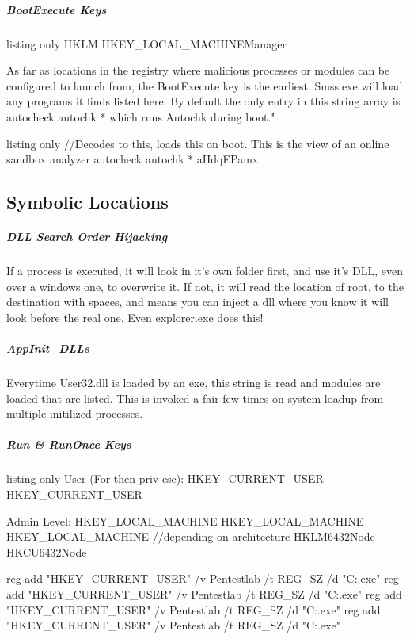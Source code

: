 \subparagraph{BootExecute Keys}
\begin{tcblisting}{listing only}
HKLM\SYSTEM\CurrentControlSet\Control\hivelist
HKEY_LOCAL_MACHINE\SYSTEM{}\Control\Session Manager
\end{tcblisting}

As far as locations in the registry where malicious processes or modules can be configured to launch from, the BootExecute key is the earliest. Smss.exe will load any programs it finds listed here. By default the only entry in this string array is autocheck autochk * which runs Autochk during boot."

\begin{tcblisting}{listing only}
//Decodes to this, loads this on boot. This is the view of an online sandbox analyzer
autocheck autochk * aHdqEPamx
\end{tcblisting}


\subsection{Symbolic Locations}

\subparagraph{DLL Search Order Hijacking}
If a process is executed, it will look in it's own folder first, and use it's DLL, even over a windows one, to overwrite it. If not, it will read the location of root, 
to the destination with spaces, and means you can inject a dll where you know it will look before the real one. Even explorer.exe does this!

\subparagraph{AppInit_DLLs}
Everytime User32.dll is loaded by an exe, this string is read and modules are loaded that are listed. This is invoked a fair few times on system loadup from multiple initilized processes.


\subparagraph{Run & RunOnce Keys}

\begin{tcblisting}{listing only}
User (For then priv esc):
HKEY_CURRENT_USER\Software\Microsoft\Windows\CurrentVersion\Run
HKEY_CURRENT_USER\Software\Microsoft\Windows\CurrentVersion\RunOnce

Admin Level:
HKEY_LOCAL_MACHINE\SOFTWARE\Microsoft\Windows\CurrentVersion\Run
HKEY_LOCAL_MACHINE\SOFTWARE\Microsoft\Windows\CurrentVersion\RunOnce
HKEY_LOCAL_MACHINE\Software\Microsoft\Windows\CurrentVersion\Policies\Explorer\Run
//depending on architecture
HKLM\Software\Wow6432Node\Microsoft\Windows\CurrentVersion\Run
HKCU\Software\Wow6432Node\Microsoft\Windows\CurrentVersion\RunOnce

reg add "HKEY_CURRENT_USER\Software\Microsoft\Windows\CurrentVersion\Run" /v Pentestlab /t REG_SZ /d "C:\Users\pentestlab\pentestlab.exe"
reg add "HKEY_CURRENT_USER\Software\Microsoft\Windows\CurrentVersion\RunOnce" /v Pentestlab /t REG_SZ /d "C:\Users\pentestlab\pentestlab.exe"
reg add "HKEY_CURRENT_USER\Software\Microsoft\Windows\CurrentVersion\RunServices" /v Pentestlab /t REG_SZ /d "C:\Users\pentestlab\pentestlab.exe"
reg add "HKEY_CURRENT_USER\Software\Microsoft\Windows\CurrentVersion\RunServicesOnce" /v Pentestlab /t REG_SZ /d "C:\Users\pentestlab\pentestlab.exe"

\end{tcblisting}

